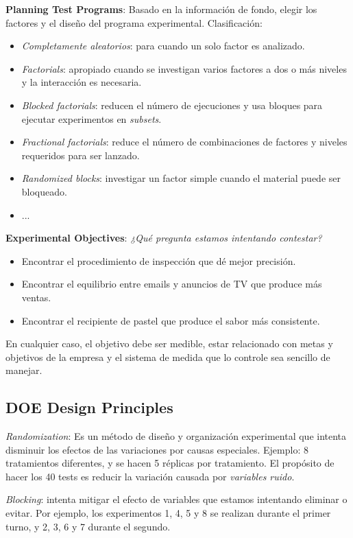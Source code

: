 \documentclass[oneside]{book}
\begin{document}
\textbf{Planning Test Programs}: Basado en la información de fondo, elegir los factores y el diseño del programa experimental. Clasificación:
\begin{itemize}
	\item \textit{Completamente aleatorios}: para cuando un solo factor es analizado.
	\item \textit{Factorials}: apropiado cuando se investigan varios factores a dos o más niveles y la interacción es necesaria.
	\item \textit{Blocked factorials}: reducen el número de ejecuciones y usa bloques para ejecutar experimentos en \textit{subsets}.
	\item \textit{Fractional factorials}: reduce el número de combinaciones de factores y niveles requeridos para ser lanzado.
	\item \textit{Randomized blocks}: investigar un factor simple cuando el material puede ser bloqueado.
	\item ...
\end{itemize}
 
\textbf{Experimental Objectives}: \textit{¿Qué pregunta estamos intentando contestar?} 
\begin{itemize}
	\item Encontrar el procedimiento de inspección que dé mejor precisión.
	\item Encontrar el equilibrio entre emails y anuncios de TV que produce más ventas.
	\item Encontrar el recipiente de pastel que produce el sabor más consistente.
\end{itemize}
En cualquier caso, el objetivo debe ser medible, estar relacionado con metas y objetivos de la empresa y el sistema de medida que lo controle sea sencillo de manejar.

\subsection{DOE Design Principles}

\textit{Randomization}: Es un método de diseño y organización experimental que intenta disminuir los efectos de las variaciones por causas especiales. Ejemplo: 8 tratamientos diferentes, y se hacen 5 réplicas por tratamiento. El propósito de hacer los 40 tests es reducir la variación causada por \textit{variables ruido}.

\textit{Blocking}: intenta mitigar el efecto de variables que estamos intentando eliminar o evitar. Por ejemplo, los experimentos 1, 4, 5 y 8 se realizan durante el primer turno, y 2, 3, 6 y 7 durante el segundo.
\end{document}
